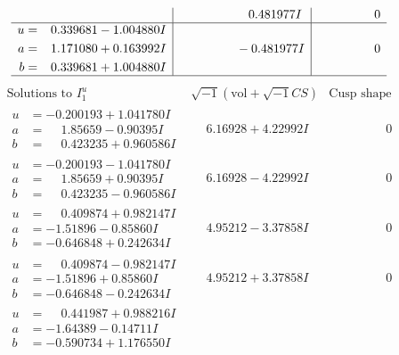 \documentclass[1p]{elsarticle_modified}
\theoremstyle{definition}
\newcommand{\I}{\sqrt{-1}}
\begin{document}
$$\begin{array}{c|c|c}
 & \phantom{-0.000000 -}0.481977 I & \phantom{-0.000000 } 0 \\ \hline\begin{aligned}
u &= \phantom{-}0.339681 - 1.004880 I \\
a &= \phantom{-}1.171080 + 0.163992 I \\
b &= \phantom{-}0.339681 + 1.004880 I\end{aligned}
 & \phantom{-0.000000 } -0.481977 I & \phantom{-0.000000 } 0\\
 \hline 
 \end{array}$$\newpage$$\begin{array}{c|c|c}  
\text{Solutions to }I^u_{1}& \I (\text{vol} + \sqrt{-1}CS) & \text{Cusp shape}\\
 \hline 
\begin{aligned}
u &= -0.200193 + 1.041780 I \\
a &= \phantom{-}1.85659 - 0.90395 I \\
b &= \phantom{-}0.423235 + 0.960586 I\end{aligned}
 & \phantom{-}6.16928 + 4.22992 I & \phantom{-0.000000 } 0 \\ \hline\begin{aligned}
u &= -0.200193 - 1.041780 I \\
a &= \phantom{-}1.85659 + 0.90395 I \\
b &= \phantom{-}0.423235 - 0.960586 I\end{aligned}
 & \phantom{-}6.16928 - 4.22992 I & \phantom{-0.000000 } 0 \\ \hline\begin{aligned}
u &= \phantom{-}0.409874 + 0.982147 I \\
a &= -1.51896 - 0.85860 I \\
b &= -0.646848 + 0.242634 I\end{aligned}
 & \phantom{-}4.95212 - 3.37858 I & \phantom{-0.000000 } 0 \\ \hline\begin{aligned}
u &= \phantom{-}0.409874 - 0.982147 I \\
a &= -1.51896 + 0.85860 I \\
b &= -0.646848 - 0.242634 I\end{aligned}
 & \phantom{-}4.95212 + 3.37858 I & \phantom{-0.000000 } 0 \\ \hline\begin{aligned}
u &= \phantom{-}0.441987 + 0.988216 I \\
a &= -1.64389 - 0.14711 I \\
b &= -0.590734 + 1.176550 I\end{aligned}

\end{array}$$
\end{document}
